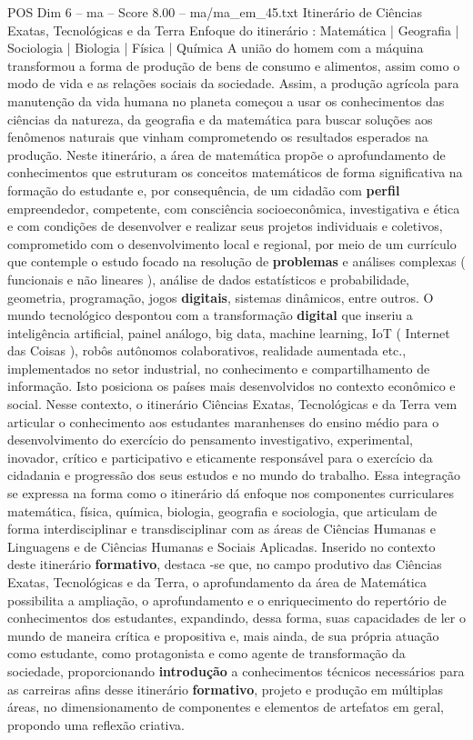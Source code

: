 \begin{textsample}{POS Dim 6 – ma – Score 8.00 – ma/ma\_em\_45.txt}  \label{ex:f6_pos_098}
Itinerário de Ciências Exatas, Tecnológicas e da Terra Enfoque do itinerário : Matemática | Geografia | Sociologia | Biologia | Física | Química A união do homem com a máquina transformou a forma de produção de bens de consumo e alimentos, assim como o modo de vida e as relações sociais da sociedade.
Assim, a produção agrícola para manutenção da vida humana no planeta começou a usar os conhecimentos das ciências da natureza, da geografia e da matemática para buscar soluções aos fenômenos naturais que vinham comprometendo os resultados esperados na produção.
Neste itinerário, a área de matemática propõe o aprofundamento de conhecimentos que estruturam os conceitos matemáticos de forma significativa na formação do estudante e, por consequência, de um cidadão com \textbf{perfil} empreendedor, competente, com consciência socioeconômica, investigativa e ética e com condições de desenvolver e realizar seus projetos individuais e coletivos, comprometido com o desenvolvimento local e regional, por meio de um currículo que contemple o estudo focado na resolução de \textbf{problemas} e análises complexas ( funcionais e não lineares ), análise de dados estatísticos e probabilidade, geometria, programação, jogos \textbf{digitais}, sistemas dinâmicos, entre outros.
O mundo tecnológico despontou com a transformação \textbf{digital} que inseriu a inteligência artificial, painel análogo, big data, machine learning, IoT ( Internet das Coisas ), robôs autônomos colaborativos, realidade aumentada etc., implementados no setor industrial, no conhecimento e compartilhamento de informação.
Isto posiciona os países mais desenvolvidos no contexto econômico e social.
Nesse contexto, o itinerário Ciências Exatas, Tecnológicas e da Terra vem articular o conhecimento aos estudantes maranhenses do ensino médio para o desenvolvimento do exercício do pensamento investigativo, experimental, inovador, crítico e participativo e eticamente responsável para o exercício da cidadania e progressão dos seus estudos e no mundo do trabalho.
Essa integração se expressa na forma como o itinerário dá enfoque nos componentes curriculares matemática, física, química, biologia, geografia e sociologia, que articulam de forma interdisciplinar e transdisciplinar com as áreas de Ciências Humanas e Linguagens e de Ciências Humanas e Sociais Aplicadas.
Inserido no contexto deste itinerário \textbf{formativo}, destaca -se que, no campo produtivo das Ciências Exatas, Tecnológicas e da Terra, o aprofundamento da área de Matemática possibilita a ampliação, o aprofundamento e o enriquecimento do repertório de conhecimentos dos estudantes, expandindo, dessa forma, suas capacidades de ler o mundo de maneira crítica e propositiva e, mais ainda, de sua própria atuação como estudante, como protagonista e como agente de transformação da sociedade, proporcionando \textbf{introdução} a conhecimentos técnicos necessários para as carreiras afins desse itinerário \textbf{formativo}, projeto e produção em múltiplas áreas, no dimensionamento de componentes e elementos de artefatos em geral, propondo uma reflexão criativa.

\end{textsample}
